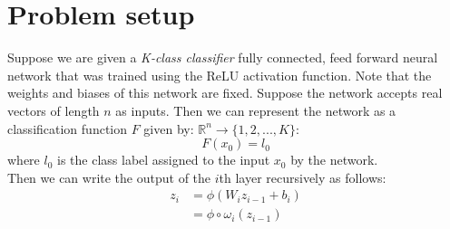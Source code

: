 \section{Problem setup}
Suppose we are given a \textit{K-class classifier} fully connected, feed forward neural network that was trained using the ReLU activation function. Note that the weights and biases of this network are fixed. Suppose the network accepts real vectors of length $n$ as inputs. Then we can represent the network as a classification function $F$ given by: $\mathbb{R}^n \longrightarrow \{1, 2, ..., K\}$:
\begin{equation}
    F(x_0) = l_0
\end{equation}
where $l_0$ is the class label assigned to the input $x_0$ by the network.\\

Then we can write the output of the $i$th layer recursively as follows:
\begin{equation}\label{eq_nn_output_recursive}
\begin{split}
    z_{i} &= \phi(W_{i} z_{i-1} + b_{i})\\
    &= \phi \circ \omega_i(z_{i - 1})
\end{split}
\end{equation}